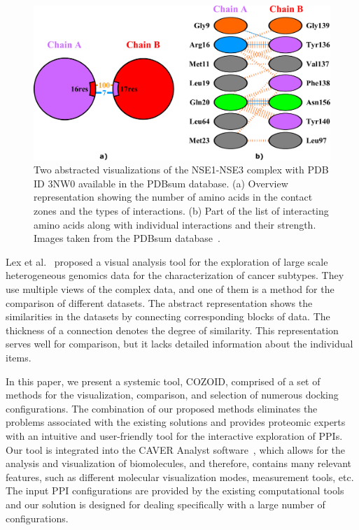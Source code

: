\documentclass[twocolumn]{bmcart}%
\begin{document}
\begin{figure}[tb]
  \centering	
  \includegraphics[width=0.9\columnwidth]{images/figure2.pdf}
  \caption{
    Two abstracted visualizations of the NSE1-NSE3 complex with PDB ID 3NW0 available in the PDBsum database. (a) Overview representation showing the number of amino acids in the contact zones and the types of interactions. (b) Part of the list of interacting amino acids along with individual interactions and their strength. Images taken from the PDBsum database~\cite{pdbsum}.}
    \label{fig:pdbsum}
\end{figure}

Lex et al.~\cite{Lex2012} proposed a visual analysis tool for the exploration of large scale heterogeneous genomics data for the characterization of cancer subtypes.
They use multiple views of the complex data, and one of them is a method for the comparison of different datasets.
The abstract representation shows the similarities in the datasets by connecting corresponding blocks of data. 
The thickness of a connection denotes the degree of similarity. 
This representation serves well for comparison, but it lacks detailed information about the individual items.

In this paper, we present a systemic tool, COZOID, comprised of a set of methods for the visualization, comparison, and selection of numerous docking configurations.
The combination of our proposed methods eliminates the problems associated with the existing solutions and provides proteomic experts with an intuitive and user-friendly tool for the interactive exploration of PPIs.
Our tool is integrated into the CAVER Analyst software~\cite{kozlikova2014caver}, which allows for the analysis and visualization of biomolecules, and therefore, contains many relevant features, such as different molecular visualization modes, measurement tools, etc.  
The input PPI configurations are provided by the existing computational tools and our solution is designed for dealing specifically with a large number of configurations.
\end{document}
